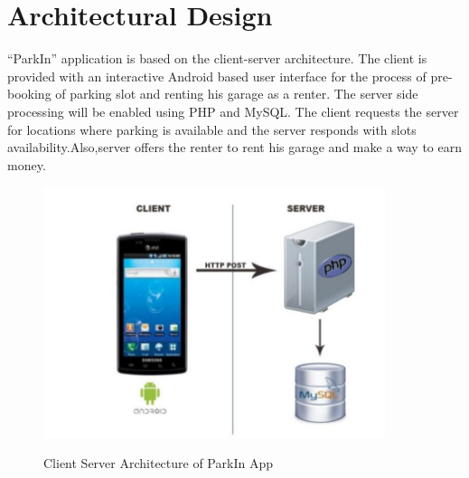 \documentclass[12pt, english]{article}
\begin{document}
\section{Architectural Design} %
“ParkIn” application is based on the client-server architecture. The client is provided with an interactive Android based user interface for the process of pre-booking of parking slot and renting his garage as a renter. The server side processing will be enabled using PHP and MySQL. The client requests the server for locations where parking is available and the server responds with slots availability.Also,server offers the renter to rent his garage and make a way to earn money.
\begin{figure}[h!]
        \begin{minipage}[b]{1\linewidth}
        \centering
        \includegraphics[width=10cm]{architecture.PNG}
        \label{arch}
        \caption{Client Server Architecture of ParkIn App}
        \end{minipage}
\end{figure}
\end{document}
